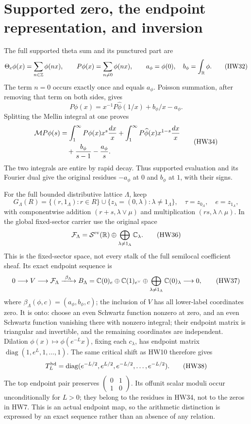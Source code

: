 \section{Supported zero, the endpoint representation, and inversion}

The full supported theta sum and its punctured part are
\[
 \Theta_e\phi(x)=\sum_{n\in\mathbb Z}\phi(nx),\qquad
 P\phi(x)=\sum_{n\ne0}\phi(nx),\qquad
 a_\phi=\phi(0),\quad b_\phi=\int_\mathbb R\phi.
 \tag{HW32}
\]
The term \(n=0\) occurs exactly once and equals \(a_\phi\).
Poisson summation, after removing that term on both sides, gives
\[
 P\phi(x)=x^{-1}P\widehat\phi(1/x)+b_\phi/x-a_\phi .
 \tag{HW33}
\]
Splitting the Mellin integral at one proves
\[
 \begin{split}
 \mathcal M P\phi(s)
  &=\int_1^\infty P\phi(x)x^s\frac{dx}{x}
    +\int_1^\infty P\widehat\phi(x)x^{1-s}\frac{dx}{x}\\
  &\quad+\frac{b_\phi}{s-1}-\frac{a_\phi}{s}.
 \end{split}
 \tag{HW34}
\]
The two integrals are entire by rapid decay. Thus supported
evaluation and its Fourier dual give the original residues
\(-a_\phi\) at \(0\) and \(b_\phi\) at \(1\), with their signs.

For the full bounded distributive lattice \(\Lambda\), keep
\[
 G_\Lambda(R)=\{(r,1_\Lambda):r\in R\}
       \cup\{z_\lambda=(0,\lambda):\lambda\ne1_\Lambda\},
 \quad \tau=z_{0_\Lambda},\quad e=z_{1_\Lambda},
 \tag{HW35}
\]
with componentwise addition \((r+s,\lambda\vee\mu)\) and
multiplication \((rs,\lambda\wedge\mu)\).
In the global fixed-sector carrier use the original space
\[
 \mathcal F_\Lambda=\mathcal S^{\rm ev}(\mathbb R)
          \oplus\bigoplus_{\lambda\ne1_\Lambda}\mathbb C_\lambda .
 \tag{HW36}
\]
This is the fixed-sector space, not every stalk of the full
semilocal coefficient sheaf. Its exact endpoint sequence is
\[
 0\longrightarrow V\longrightarrow\mathcal F_\Lambda
 \xrightarrow{\ \beta_\Lambda\ }
 B_\Lambda
 =\mathbb C(0)_e\oplus\mathbb C(1)_{e^\vee}
                  \oplus\bigoplus_{\lambda\ne1_\Lambda}\mathbb C(0)_\lambda
 \longrightarrow0,
 \tag{HW37}\label{hw:endpointseq}
\]
where \(\beta_\Lambda(\phi,c)=(a_\phi,b_\phi,c)\);
the inclusion of \(V\) has all lower-label coordinates zero.
It is onto: choose an even Schwartz function nonzero at zero,
and an even Schwartz function vanishing there with nonzero
integral; their endpoint matrix is triangular and invertible,
and the remaining coordinates are independent.
Dilation \(\phi(x)\mapsto\phi(e^{-L}x)\), fixing each \(c_\lambda\),
has endpoint matrix
\(\operatorname{diag}(1,e^L,1,\ldots,1)\).
The same critical shift as HW10 therefore gives
\[
 T_L^{\rm bd}
   =\operatorname{diag}(e^{-L/2},e^{L/2},
                                e^{-L/2},\ldots,e^{-L/2}).
 \tag{HW38}
\]
The top endpoint pair preserves
\(\left(\begin{smallmatrix}0&1\\1&0\end{smallmatrix}\right)\).
Its offunit scalar moduli occur unconditionally for \(L>0\);
they belong to the residues in HW34, not to the zeros in HW7.
This is an actual endpoint map, so the arithmetic distinction
is expressed by an exact sequence rather than an absence of
any relation.


